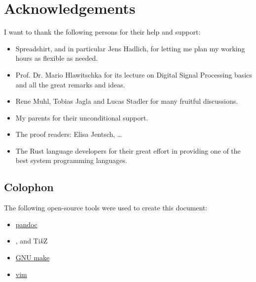 \chapter*{Acknowledgements}

I want to thank the following persons for their help and support:

\begin{itemize}
\item Spreadshirt, and in particular Jens Hadlich, for letting me plan my working hours as flexible as needed.
\item Prof. Dr. Mario Hlawitschka for its lecture on Digital Signal Processing basics and all the great remarks and ideas.
\item Rene Muhl, Tobias Jagla and Lucas Stadler for many fruitful discussions.
\item My parents for their unconditional support.
\item The proof readers: Elisa Jentsch, \ldots
\item The Rust language developers for their great effort in providing one of the best system programming languages.
\end{itemize}

\section*{Colophon}

The following open-source tools were used to create this document:

\begin{itemize}
\item \href{https://pandoc.org}{pandoc}
\item \LaTeXe{}, \XeLaTeX{} and Ti\textit{k}Z
\item \href{https://www.gnu.org/software/make}{GNU make}
\item \href{https://www.vim.org}{vim}
\end{itemize}
